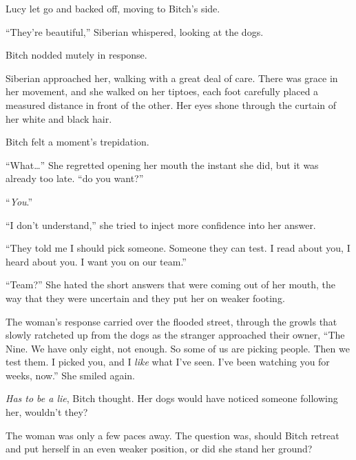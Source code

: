 Lucy let go and backed off, moving to Bitch's side.



``They're beautiful,'' Siberian whispered, looking at the dogs.



Bitch nodded mutely in response.



Siberian approached her, walking with a great deal of care.  There was grace in her movement, and she walked on her tiptoes, each foot carefully placed a measured distance in front of the other.  Her eyes shone through the curtain of her white and black hair.



Bitch felt a moment's trepidation.



``What\ldots'' She regretted opening her mouth the instant she did, but it was already too late.  ``do you want?''



``\emph{You}.''



``I don't understand,'' she tried to inject more confidence into her answer.



``They told me I should pick someone.  Someone they can test.  I read about you, I heard about you.  I want you on our team.''



``Team?''  She hated the short answers that were coming out of her mouth, the way that they were uncertain and they put her on weaker footing.



The woman's response carried over the flooded street, through the growls that slowly ratcheted up from the dogs as the stranger approached their owner, ``The Nine.  We have only eight, not enough.  So some of us are picking people.  Then we test them.  I picked you, and I \emph{like} what I've seen.  I've been watching you for weeks, now.''  She smiled again.



\emph{Has to be a lie}, Bitch thought.  Her dogs would have noticed someone following her, wouldn't they?



The woman was only a few paces away.  The question was, should Bitch retreat and put herself in an even weaker position, or did she stand her ground?



